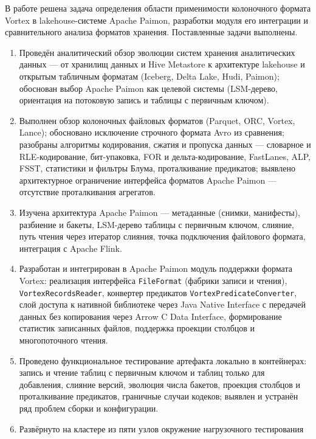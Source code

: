 \conclusion

В работе решена задача определения области применимости колоночного формата Vortex в
lakehouse-системе Apache Paimon, разработки модуля его интеграции и сравнительного
анализа форматов хранения. Поставленные задачи выполнены.

\begin{enumerate}
    \item Проведён аналитический обзор эволюции систем хранения аналитических данных
        --- от хранилищ данных и Hive Metastore к архитектуре lakehouse и открытым
        табличным форматам (Iceberg, Delta Lake, Hudi, Paimon); обоснован выбор
        Apache Paimon как целевой системы (LSM-дерево, ориентация на потоковую запись
        и таблицы с первичным ключом).
    \item Выполнен обзор колоночных файловых форматов (Parquet, ORC, Vortex, Lance);
        обосновано исключение строчного формата Avro из сравнения; разобраны
        алгоритмы кодирования, сжатия и пропуска данных --- словарное и RLE-кодирование,
        бит-упаковка, FOR и дельта-кодирование, FastLanes, ALP, FSST, статистики и
        фильтры Блума, проталкивание предикатов; выявлено архитектурное ограничение
        интерфейса форматов Apache Paimon --- отсутствие проталкивания агрегатов.
    \item Изучена архитектура Apache Paimon --- метаданные (снимки, манифесты),
        разбиение и бакеты, LSM-дерево таблицы с первичным ключом, слияние, путь
        чтения через итератор слияния, точка подключения файлового формата, интеграция
        с Apache Flink.
    \item Разработан и интегрирован в Apache Paimon модуль поддержки формата Vortex:
        реализация интерфейса \texttt{FileFormat} (фабрики записи и чтения),
        \texttt{VortexRecordsReader}, конвертер предикатов
        \texttt{VortexPredicateConverter}, слой доступа к нативной библиотеке через
        Java Native Interface с передачей данных без копирования через Arrow C Data
        Interface, формирование статистик записанных файлов, поддержка проекции
        столбцов и многопоточного чтения.
    \item Проведено функциональное тестирование артефакта локально в контейнерах:
        запись и чтение таблиц с первичным ключом и таблиц только для добавления,
        слияние версий, эволюция числа бакетов, проекция столбцов и проталкивание
        предикатов, граничные случаи кодеков; выявлен и устранён ряд проблем сборки и
        конфигурации.
    \item Развёрнуто на кластере из пяти узлов окружение нагрузочного тестирования

\end{enumerate}
